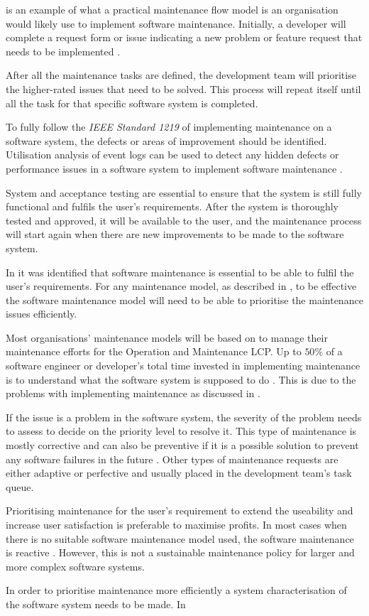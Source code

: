  is an example of what a practical maintenance flow model is an organisation would likely use to implement software maintenance. Initially, a developer will complete a request form or issue indicating a new problem or feature request that needs to be implemented \cite{Tang2010}.\par After all the maintenance tasks are defined, the development team will prioritise the higher-rated issues that need to be solved. This process will repeat itself until all the task for that specific software system is completed.\par To fully follow the \textit{IEEE Standard 1219} of implementing maintenance on a software system, the defects or areas of improvement should be identified. Utilisation analysis of event logs can be used to detect any hidden defects or performance issues in a software system to implement software maintenance \cite{Cinque2013, Rong2018a, Levin2019}.\par System and acceptance testing are essential to ensure that the system is still fully functional and fulfils the user's requirements. After the system is thoroughly tested and approved, it will be available to the user, and the maintenance process will start again when there are new improvements to be made to the software system.\par In  it was identified that software maintenance is essential to be able to fulfil the user's requirements. For any maintenance model, as described in , to be effective the software maintenance model will need to be able to prioritise the maintenance issues efficiently. \par Most organisations' maintenance models will be based on  to manage their maintenance efforts for the Operation and Maintenance LCP. Up to $50\%$ of a software engineer or developer's total time invested in implementing maintenance is to understand what the software system is supposed to do \cite{Tang2010}. This is due to the problems with implementing maintenance as discussed in .\par If the issue is a problem in the software system, the severity of the problem needs to assess to decide on the priority level to resolve it. This type of maintenance is mostly corrective and can also be preventive if it is a possible solution to prevent any software failures in the future \cite{Tang2010}. Other types of maintenance requests are either adaptive or perfective and usually placed in the development team's task queue. \par Prioritising maintenance for the user's requirement to extend the useability and increase user satisfaction is preferable to maximise profits. In most cases when there is no suitable software maintenance model used, the software maintenance is reactive \cite{Araujo2021}. However, this is not a sustainable maintenance policy for larger and more complex software systems. \par In order to prioritise maintenance more efficiently a system characterisation of the software system needs to be made. In 